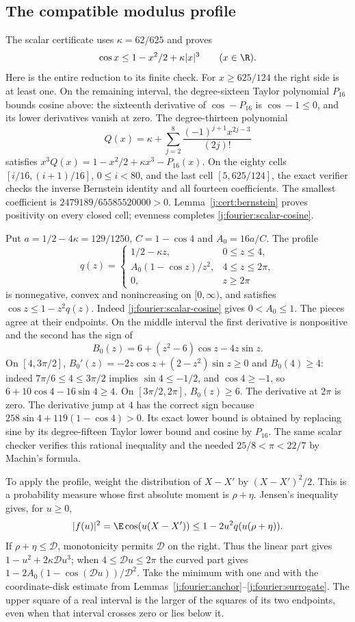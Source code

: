 \subsection{The compatible modulus profile}
\label{j:fourier:profile}
The scalar certificate uses $\kappa=62/625$ and proves
\begin{equation}\label{j:fourier:scalar-cosine}
 \cos x\le1-x^2/2+\kappa|x|^3\qquad(x\in\R).
\end{equation}
Here is the entire reduction to its finite check. For $x\ge625/124$ the
right side is at least one. On the remaining interval, the degree-sixteen
Taylor polynomial $P_{16}$ bounds cosine above: the sixteenth derivative
of $\cos-P_{16}$ is $\cos-1\le0$, and its lower derivatives vanish at
zero. The degree-thirteen polynomial
\[
 Q(x)=\kappa+\sum_{j=2}^{8}\frac{(-1)^{j+1}x^{2j-3}}{(2j)!}
\]
satisfies $x^3Q(x)=1-x^2/2+\kappa x^3-P_{16}(x)$.
On the eighty cells $[i/16,(i+1)/16]$, $0\le i<80$, and the last
cell $[5,625/124]$, the exact verifier checks the inverse Bernstein
identity and all fourteen coefficients. The smallest coefficient is
$2479189/65585520000>0$. Lemma~\ref{j:cert:bernstein} proves positivity
on every closed cell; evenness completes \eqref{j:fourier:scalar-cosine}.

Put $a=1/2-4\kappa=129/1250$, $C=1-\cos4$ and $A_0=16a/C$.
The profile
\[
 q(z)=\begin{cases}
 1/2-\kappa z,&0\le z\le4,\\
 A_0(1-\cos z)/z^2,&4\le z\le2\pi,\\
 0,&z\ge2\pi
 \end{cases}
\]
is nonnegative, convex and nonincreasing on $[0,\infty)$, and satisfies
$\cos z\le1-z^2q(z)$. Indeed \eqref{j:fourier:scalar-cosine} gives
$0<A_0\le1$. The pieces agree at their endpoints. On the middle interval
the first derivative is nonpositive and the second has the sign of
\[
 B_0(z)=6+(z^2-6)\cos z-4z\sin z.
\]
On $[4,3\pi/2]$, $B_0'(z)=-2z\cos z+(2-z^2)\sin z\ge0$ and
$B_0(4)\ge4$: indeed $7\pi/6\le4\le3\pi/2$ implies
$\sin4\le-1/2$, and $\cos4\ge-1$, so
$6+10\cos4-16\sin4\ge4$. On $[3\pi/2,2\pi]$, $B_0(z)\ge6$.
The derivative at $2\pi$ is zero. The derivative jump at $4$ has the
correct sign because $258\sin4+119(1-\cos4)>0$. Its exact lower bound is
obtained by replacing sine by its degree-fifteen Taylor lower bound and
cosine by $P_{16}$. The same scalar checker verifies this rational
inequality and the needed $25/8<\pi<22/7$ by Machin's formula.

To apply the profile, weight the distribution of $X-X'$ by
$(X-X')^2/2$. This is a probability measure whose first absolute moment
is $\rho+\eta$. Jensen's inequality gives, for $u\ge0$,
\[
 |f(u)|^2=\E\cos(u(X-X'))
 \le1-2u^2q(u(\rho+\eta)).
\]
If $\rho+\eta\le \mathcal D$, monotonicity permits $\mathcal D$ on the right. Thus the
linear part gives $1-u^2+2\kappa \mathcal Du^3$; when $4\le \mathcal Du\le2\pi$ the
curved part gives $1-2A_0(1-\cos(\mathcal Du))/\mathcal D^2$.
Take the minimum with one and with the coordinate-disk estimate from
Lemmas~\ref{j:fourier:anchor}--\ref{j:fourier:surrogate}. The upper
square of a real interval is the larger of the squares of its two
endpoints, even when that interval crosses zero or lies below it.

